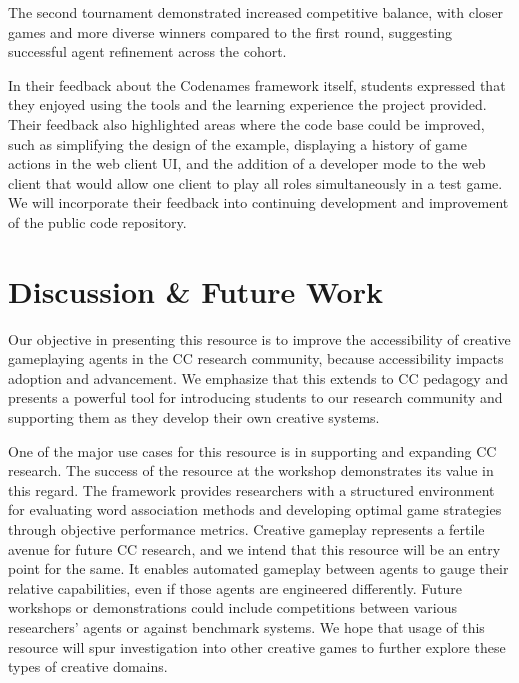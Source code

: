 \documentclass[phd,electronic,oneside,twosidetoc,letterpaper,chaptercenter,parttop,lof]{byumsphd}
\begin{document}
The second tournament demonstrated increased competitive balance, with closer games and more diverse winners compared to the first round, suggesting successful agent refinement across the cohort.

In their feedback about the Codenames framework itself, students expressed that they enjoyed using the tools and the learning experience the project provided. Their feedback also highlighted areas where the code base could be improved, such as simplifying the design of the example, displaying a history of game actions in the web client UI,  and the addition of a developer mode to the web client that would allow one client to play all roles simultaneously in a test game. We will incorporate their feedback into continuing development and improvement of the public code repository.

\section{Discussion \& Future Work}

Our objective in presenting this resource is to improve the accessibility of creative gameplaying agents in the CC research community, because accessibility impacts adoption and advancement. We emphasize that this extends to CC pedagogy and presents a powerful tool for introducing students to our research community and supporting them as they develop their own creative systems.

One of the major use cases for this resource is in supporting and expanding CC research. The success of the resource at the workshop demonstrates its value in this regard. The framework provides researchers with a structured environment for evaluating word association methods and developing optimal game strategies through objective performance metrics. Creative gameplay represents a fertile avenue for future CC research, and we intend that this resource will be an entry point for the same. It enables automated gameplay between agents to gauge their relative capabilities, even if those agents are engineered differently. Future workshops or demonstrations could include competitions between various researchers' agents or against benchmark systems. We hope that usage of this resource will spur investigation into other creative games to further explore these types of creative domains.
\end{document}

